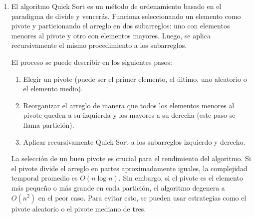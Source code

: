 \documentclass[12pt]{article}
\begin{document}
\begin{enumerate}
            \item El algoritmo Quick Sort es un método de ordenamiento basado en el paradigma de divide y vencerás. Funciona seleccionando un elemento como pivote y particionando el arreglo en dos subarreglos: uno con elementos menores al pivote y otro con elementos mayores. Luego, se aplica recursivamente el mismo procedimiento a los subarreglos.

            El proceso se puede describir en los siguientes pasos:
            \begin{enumerate}
                \item Elegir un pivote (puede ser el primer elemento, el último, uno aleatorio o el elemento medio).
                \item Reorganizar el arreglo de manera que todos los elementos menores al pivote queden a su izquierda y los mayores a su derecha (este paso se llama partición).
                \item Aplicar recursivamente Quick Sort a los subarreglos izquierdo y derecho.
            \end{enumerate}

            La selección de un buen pivote es crucial para el rendimiento del algoritmo. Si el pivote divide el arreglo en partes aproximadamente iguales, la complejidad temporal promedio es \(O(n \log n)\). Sin embargo, si el pivote es el elemento más pequeño o más grande en cada partición, el algoritmo degenera a \(O(n^2)\) en el peor caso. Para evitar esto, se pueden usar estrategias como el pivote aleatorio o el pivote mediano de tres.
        \end{enumerate}
\end{document}
